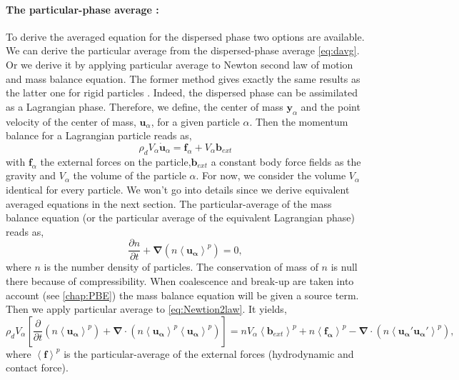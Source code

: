 \paragraph*{The particular-phase average :} 
To derive the averaged equation for the dispersed phase two options are available.
We can derive the particular average from the dispersed-phase average \ref{eq:davg}. 
Or we derive it by applying particular average to Newton second law of motion and mass balance equation. 
The former method gives exactly the same results as the latter one for rigid particles \citep{nott2011suspension}. 
Indeed, the dispersed phase can be assimilated as a Lagrangian phase. 
Therefore, we define, the center of mass $\bm{y}_\alpha$ and the point velocity of the center of mass, $\bm{u}_\alpha$, for a given particle $\alpha$.
Then the momentum balance for a Lagrangian particle reads as, 
\begin{equation}
    \label{eq:Newtion2law}
    \rho_d V_\alpha \bm{\dot{u}}_\alpha = \bm{f}_\alpha + V_\alpha \bm{b}_{ext}
\end{equation}
with $\bm{f}_\alpha$ the external forces on the particle,$\bm{b}_{ext}$ a constant body force fields as the gravity and $V_\alpha$ the volume of the particle $\alpha$. 
For now, we consider the volume $V_\alpha$ identical for every particle. 
We won't go into details since we derive equivalent averaged equations in the next section.
The particular-average of the mass balance equation (or the particular average of the equivalent Lagrangian phase) reads as,
\begin{equation}
    \label{eq:pavgMASS}
    \frac{\partial n}{\partial t} + \bm{\nabla}\left(n\left<\bm{u_\alpha}\right>^p\right) = 0,
\end{equation} 
where $n$ is the number density of particles.
The conservation of mass of $n$ is null there because of compressibility. 
When coalescence and break-up are taken into account (see \ref{chap:PBE}) the mass balance equation will be given a source term. 
Then we apply particular average to \ref{eq:Newtion2law}.
It yields, 
\begin{equation}
    \label{eq:pavgsp}
    \rho_d V_\alpha \left[\frac{\partial }{\partial t}(n\left<\bm{u_\alpha}\right>^p) 
    + \bm{\nabla}\cdot(n\left<\bm{u_\alpha}\right>^p\left<\bm{u_\alpha}\right>^p)\right] 
    = n V_\alpha \left<\bm{b}_{ext}\right>^p 
    + n\left<\bm{f_\alpha}\right>^p 
    - \bm{\nabla}\cdot(n\left<\bm{u_\alpha'u_\alpha'}\right>^p),
\end{equation} 
where $\left<\bm{f}\right>^p$ is the particular-average of the external forces (hydrodynamic and contact force).

